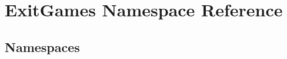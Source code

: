 \hypertarget{namespace_exit_games}{}\section{Exit\+Games Namespace Reference}
\label{namespace_exit_games}
\subsection*{Namespaces}
\begin{DoxyCompactItemize}
\end{DoxyCompactItemize}
